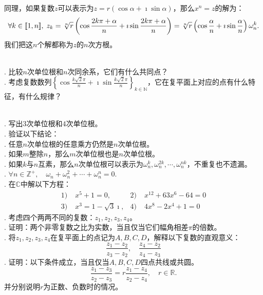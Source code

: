 \documentclass[12pt,UTF8,fontset=none]{ctexbook}
\begin{document}
同理，如果复数$z$可以表示为$z = r(\cos{\alpha} + \imath \sin{\alpha})$，那么$x^n = z$的解为：
$$ \forall k\in[\![1,n]\!], \; z_k = \sqrt[n]{r}\left(\cos{\frac{2k\pi + \alpha}{n}} + \imath \sin{\frac{2k\pi + \alpha}{n}}\right) = \sqrt[n]{r}\left(\cos{\frac{\alpha}{n}} + \imath \sin{\frac{\alpha}{n}}\right)\omega_n^k. $$
我们把这$n$个解都称为$z$的$n$次方根。

\begin{sk}
    \mbox{} \\
    . 比较$n$次单位根和$n$次同余系，它们有什么共同点？\\
    . 考虑复数数列$\displaystyle\left\{\cos{\frac{k\sqrt{2}\pi}{n}} + \imath \sin{\frac{k\sqrt{2}\pi}{n}} \right\}_{k\in\mathbb{N}}$，它在复平面上对应的点有什么特征，有什么规律？
\end{sk}

\begin{xt}
    \mbox{} \\
    . 写出$3$次单位根和$4$次单位根。 \\
    . 验证以下结论：\\
    . 任意$n$次单位根的任意乘方仍然是$n$次单位根。\\
    . 如果$m$整除$n$，那么$m$次单位根也是$n$次单位根。\\
    . 如果$k$与$n$互素，那么$n$次单位根可以表示为$\omega_n^k, \omega_n^{2k}, \cdots , \omega_n^{nk}$，不重复也不遗漏。\\
    . $ \forall n\in\mathbb{Z}^+, \quad \omega_n + \omega_n^2 + \cdots + \omega_n^n = 0. $\\
    . 在$\mathbb{C}$中解以下方程：
    \begin{align*}
        1)\;& x^5 + 1 = 0,  & 2)\;& x^{12} + 63x^6 - 64 = 0 \\
        3)\;& x^3 = 1 - \sqrt{3}\imath,  & 4)\;& 4x^8 - 2x^4 + 1 = 0 
    \end{align*}
    . 考虑四个两两不同的复数：$z_1,z_2,z_3,z_4$。\\
    . 证明：两个非零复数之比为实数，当且仅当它们幅角相差$\pi$的倍数。\\
    . 将$z_1,z_2,z_3,z_4$在复平面上的点记为$A,B,C,D$，解释以下复数的直观意义：
    $$ \frac{z_1 - z_2}{z_3 - z_2}, \quad \frac{z_4 - z_2}{z_4 - z_3}  $$
    . 证明：以下条件成立，当且仅当$A,B,C,D$四点共线或共圆。
    $$ \frac{z_1 - z_3}{z_2 - z_3} = r \frac{z_1 - z_4}{z_2 - z_4}, \quad r\in \mathbb{R}. $$
    \indent 并分别说明$r$为正数、负数时的情况。

\end{xt}
\end{document}

